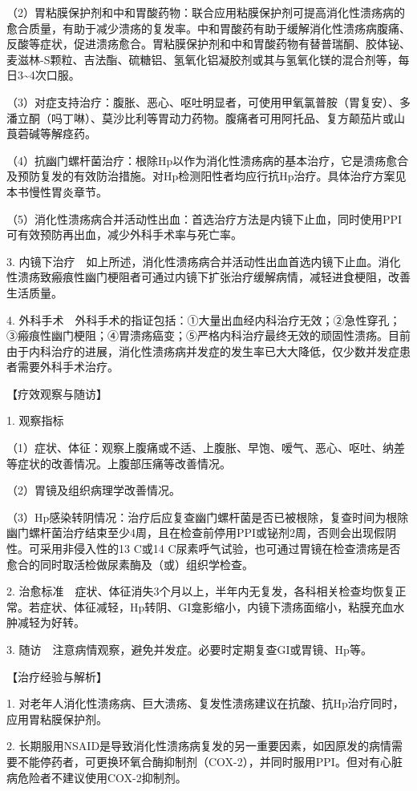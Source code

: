 （2）胃粘膜保护剂和中和胃酸药物：联合应用粘膜保护剂可提高消化性溃疡病的愈合质量，有助于减少溃疡的复发率。中和胃酸药有助于缓解消化性溃疡病腹痛、反酸等症状，促进溃疡愈合。胃粘膜保护剂和中和胃酸药物有替普瑞酮、胶体铋、麦滋林-S颗粒、吉法酯、硫糖铝、氢氧化铝凝胶剂或其与氢氧化镁的混合剂等，每日3\textasciitilde{}4次口服。

（3）对症支持治疗：腹胀、恶心、呕吐明显者，可使用甲氧氯普胺（胃复安）、多潘立酮（吗丁啉）、莫沙比利等胃动力药物。腹痛者可用阿托品、复方颠茄片或山莨菪碱等解痉药。

（4）抗幽门螺杆菌治疗：根除Hp以作为消化性溃疡病的基本治疗，它是溃疡愈合及预防复发的有效防治措施。对Hp检测阳性者均应行抗Hp治疗。具体治疗方案见本书慢性胃炎章节。

（5）消化性溃疡病合并活动性出血：首选治疗方法是内镜下止血，同时使用PPI可有效预防再出血，减少外科手术率与死亡率。

3.
内镜下治疗　如上所述，消化性溃疡病合并活动性出血首选内镜下止血。消化性溃疡致瘢痕性幽门梗阻者可通过内镜下扩张治疗缓解病情，减轻进食梗阻，改善生活质量。

4.
外科手术　外科手术的指证包括：①大量出血经内科治疗无效；②急性穿孔；③瘢痕性幽门梗阻；④胃溃疡癌变；⑤严格内科治疗最终无效的顽固性溃疡。目前由于内科治疗的进展，消化性溃疡病并发症的发生率已大大降低，仅少数并发症患者需要外科手术治疗。

【疗效观察与随访】

1. 观察指标

（1）症状、体征：观察上腹痛或不适、上腹胀、早饱、嗳气、恶心、呕吐、纳差等症状的改善情况。上腹部压痛等改善情况。

（2）胃镜及组织病理学改善情况。

（3）Hp感染转阴情况：治疗后应复查幽门螺杆菌是否已被根除，复查时间为根除幽门螺杆菌治疗结束至少4周，且在检查前停用PPI或铋剂2周，否则会出现假阴性。可采用非侵入性的{13}
C或{14}
C尿素呼气试验，也可通过胃镜在检查溃疡是否愈合的同时取活检做尿素酶及（或）组织学检查。

2.
治愈标准　症状、体征消失3个月以上，半年内无复发，各科相关检查均恢复正常。若症状、体征减轻，Hp转阴、GI龛影缩小，内镜下溃疡面缩小，粘膜充血水肿减轻为好转。

3. 随访　注意病情观察，避免并发症。必要时定期复查GI或胃镜、Hp等。

【治疗经验与解析】

1.
对老年人消化性溃疡病、巨大溃疡、复发性溃疡建议在抗酸、抗Hp治疗同时，应用胃粘膜保护剂。

2.
长期服用NSAID是导致消化性溃疡病复发的另一重要因素，如因原发的病情需要不能停药者，可更换环氧合酶抑制剂（COX-2），并同时服用PPI。但对有心脏病危险者不建议使用COX-2抑制剂。

